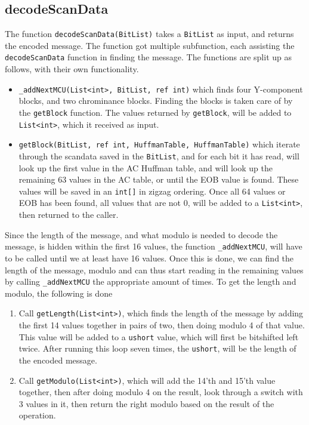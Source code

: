 \subsection{decodeScanData}
The function \lstinline|decodeScanData(BitList)| takes a \lstinline|BitList| as input, and returns the encoded message.
The function got multiple subfunction, each assisting the \lstinline|decodeScanData| function in finding the message. The functions are split up as follows, with their own functionality.
\begin{itemize}
	\item \lstinline|_addNextMCU(List<int>, BitList, ref int)| which finds four Y-component blocks, and two chrominance blocks. Finding the blocks is taken care of by the \lstinline|getBlock| function. The values returned by \lstinline|getBlock|, will be added to \lstinline|List<int>|, which it received as input.
	\item \lstinline|getBlock(BitList, ref int, HuffmanTable, HuffmanTable)| which iterate through the scandata saved in the \lstinline|BitList|, and for each bit it has read, will look up the first value in the AC Huffman table, and will look up the remaining 63 values in the AC table, or until the EOB value is found.
	These values will be saved in an \lstinline|int[]| in zigzag ordering.
	Once all 64 values or EOB has been found, all values that are not 0, will be added to a \lstinline|List<int>|, then returned to the caller.
\end{itemize}
Since the length of the message, and what modulo is needed to decode the message, is hidden within the first 16 values, the function \lstinline|_addNextMCU|, will have to be called until we at least have 16 values.
Once this is done, we can find the length of the message, modulo and can thus start reading in the remaining values by calling \lstinline|_addNextMCU| the appropriate amount of times.
To get the length and modulo, the following is done
\begin{enumerate}
	\item Call \lstinline|getLength(List<int>)|, which finds the length of the message by adding the first 14 values together in pairs of two, then doing modulo 4 of that value. 
	This value will be added to a \lstinline|ushort| value, which will first be bitshifted left twice. 
	After running this loop seven times, the \lstinline|ushort|, will be the length of the encoded message.
	\item Call \lstinline|getModulo(List<int>)|, which will add the 14'th and 15'th value together, then after doing modulo 4 on the result, look through a switch with 3 values in it, then return the right modulo based on the result of the operation.
\end{enumerate}
